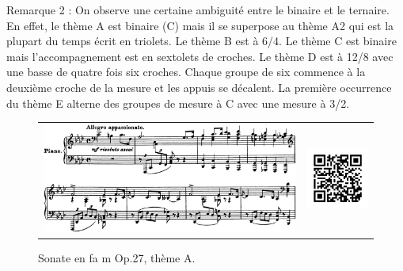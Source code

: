 Remarque 2 : On observe une certaine ambiguité entre le binaire et le ternaire. En effet, le thème A est binaire (C) mais il se superpose au thème A2 qui est la plupart du temps écrit en triolets. Le thème B est à 6/4. Le thème C est binaire mais l'accompagnement est en sextolets de croches. Le thème D est à 12/8 avec une basse de quatre fois six croches. Chaque groupe de six commence à la deuxième croche de la mesure et les appuis se décalent. La première occurrence du thème E alterne des groupes de mesure à C avec une mesure à 3/2.\\

\begin{figure}[!p]
  \begin{bigcenter}
    \begin{tabular}{lr}
      \includegraphics[width=12.5cm, keepaspectratio]{sonate-theme-A.png}
      &
      \includegraphics[width=3cm, keepaspectratio]{op1-qr.png}
    \end{tabular}
  \end{bigcenter}
  \caption{\label{sonate-theme-1}Sonate en fa m Op.27, thème A.}
\end{figure}

